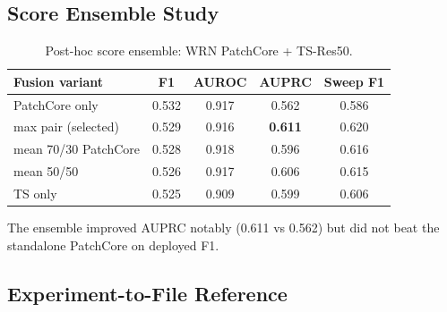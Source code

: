 \documentclass[11pt]{article}
\begin{document}
\subsection{Score Ensemble Study}

\begin{table}[H]
\centering
\caption{Post-hoc score ensemble: WRN PatchCore + TS-Res50.}
\label{tab:appendix_ensemble}
\begin{tabular}{lcccc}
\toprule
Fusion variant & F1 & AUROC & AUPRC & Sweep F1 \\
\midrule
PatchCore only         & 0.532 & 0.917 & 0.562 & 0.586 \\
max pair (selected)    & 0.529 & 0.916 & \textbf{0.611} & 0.620 \\
mean 70/30 PatchCore   & 0.528 & 0.918 & 0.596 & 0.616 \\
mean 50/50             & 0.526 & 0.917 & 0.606 & 0.615 \\
TS only                & 0.525 & 0.909 & 0.599 & 0.606 \\
\bottomrule
\end{tabular}
\end{table}

The ensemble improved AUPRC notably (0.611 vs 0.562) but did not beat the
standalone PatchCore on deployed F1.

\subsection{Experiment-to-File Reference}
\end{document}
